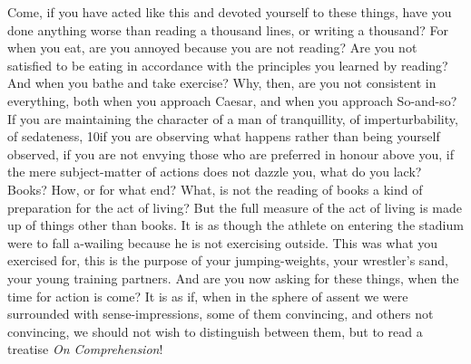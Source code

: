 Come, if you have acted like this and devoted yourself to these things, have you done anything worse than reading a thousand lines, or writing a thousand? For when you eat, are you annoyed because you are not reading? Are you not satisfied to be eating in accordance with the principles you learned by reading? And when you bathe and take exercise? Why, then, are you not consistent in everything, both when you approach Caesar, and when you approach So-and-so? If you are maintaining the character of a man of tranquillity, of imperturbability, of sedateness, 10if you are observing what happens rather than being yourself observed, if you are not envying those who are preferred in honour above you, if the mere subject-matter of actions does not dazzle you, what do you lack? Books? How, or for what end? What, is not the reading of books a kind of preparation for the act of living? But the full measure of the act of living is made up of things other than books. It is as though the athlete on entering the stadium were to fall a-wailing because he is not exercising outside. This was what you exercised for, this is the purpose of your jumping-weights, your wrestler's sand, your young training partners. And are you now asking for these things, when the time for action is come? It is as if, when in the sphere of assent we were surrounded with sense-impressions, some of them convincing, and others not convincing, we should not wish to distinguish between them, but to read a treatise \emph{On Comprehension}!

